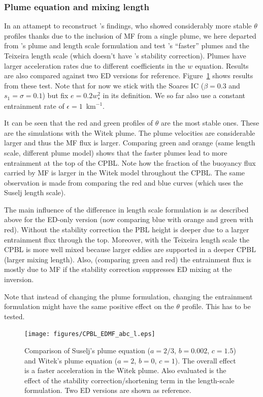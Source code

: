 \documentclass[dvipdfmx,a4paper,10pt]{article}
\begin{document}
\subsubsection{Plume equation and mixing length}

In an attamept to reconstruct \cite{witek11}'s findings, who showed considerably more stable $\theta$ profiles thanks due to the inclusion of MF from a single plume, we here departed from \cite{suselj13}'s plume and length scale formulation and test \cite{witek11}'s ``faster'' plumes and the Teixeira length scale (which doesn't have \cite{suselj13}'s stability correction). Plumes have larger acceleration rates due to different coefficients in the $w$ equation. Results are also compared against two ED versions for reference. Figure~\ref{fig:abcl} shows results from these test. Note that for now we stick with the Soares IC ($\beta=0.3$ and $s_1=\sigma=0.1$) but fix $e=0.2w_*^2$ in its definition. We so far also use a constant entrainment rate of $\epsilon=1$~km$^{-1}$.

It can be seen that the red and green profiles of $\theta$ are the most stable ones. These are the simulations with the Witek plume. The plume velocities are considerable larger and thus the MF flux is larger. Comparing green and orange (same length scale, different plume model) shows that the faster plumes lead to more entrainment at the top of the CPBL. Note how the fraction of the buoyancy flux carried by MF is larger in the Witek model throughout the CPBL. The same observation is made from comparing the red and blue curves (which uses the Suselj length scale).

The main influence of the difference in length scale formulation is as described above for the ED-only version (now comparing blue with orange and green with red). Without the stability correction the PBL height is deeper due to a larger entrainment flux through the top. Moreover, with the Teixeira length scale the CPBL is more well mixed because larger eddies are supported in a deeper CPBL (larger mixing length). Also, (comparing green and red) the entrainment flux is mostly due to MF if the stability correction suppresses ED mixing at the inversion.   

{\color{blue} Note that instead of changing the plume formulation, changing the entrainment formulation might have the same positive effect on the $\theta$ profile. This has to be tested.}

\begin{figure}[bthp]
\centering
 \texttt{[image: figures/CPBL\_EDMF\_abc\_l.eps]}
\caption{Comparison of Suselj's plume equation ($a=2/3$, $b=0.002$, $c=1.5$) and Witek's plume equation ($a=2$, $b=0$, $c=1$). The overall effect is a faster acceleration in the Witek plume. Also evaluated is the effect of the stability correction/shortening term in the length-scale formulation. Two ED versions are shown as reference.} \label{fig:abcl}
\end{figure}
\end{document}
